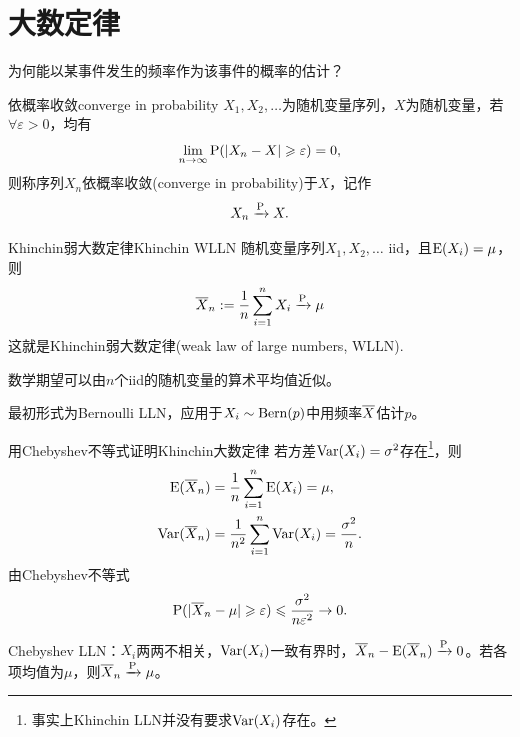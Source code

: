 \section{大数定律}
为何能以某事件发生的频率作为该事件的概率的估计？
\begin{definition}{依概率收敛}{converge in probability}
	$X_1,X_2,\ldots$为随机变量序列，$X$为随机变量，若$\forall\varepsilon > 0$，均有
	\begin{equation}\label{eq:ps-convergence-in-probability}
		\lim_{n\to\infty}\operatorname{P}(\lvert X_n - X\rvert \geqslant \varepsilon) = 0,
	\end{equation}
	则称序列$X_n$依概率收敛(converge in probability)于$X$，记作
	\[
		X_n \xrightarrow{\operatorname{P}} X.
	\]
\end{definition}
\begin{theorem}{Khinchin弱大数定律}{Khinchin WLLN}
	随机变量序列$X_1,X_2,\ldots$ iid，且$\operatorname{E}(X_i) = \mu$，则
	\begin{equation}
		\overline{X}_n := \frac1n\sum_{i=1}^nX_i \xrightarrow{\operatorname{P}} \mu
	\end{equation}
	这就是Khinchin弱大数定律(weak law of large numbers, WLLN).
\end{theorem}

\begin{corollary}
	数学期望可以由$n$个iid的随机变量的算术平均值近似。
\end{corollary}

\begin{remark}
	最初形式为Bernoulli LLN，应用于$X_i \sim \operatorname{Bern}(p)$中用频率$\overline{X}$估计$p$。
\end{remark}

\begin{example}{用Chebyshev不等式证明Khinchin大数定律}{}
	若方差$\operatorname{Var}(X_i) = \sigma^2$存在\footnote{事实上Khinchin LLN并没有要求$\operatorname{Var}(X_i)$存在。}，则
	\begin{subequations}
		\begin{align}
			\operatorname{E}(\overline{X}_n) &= \frac1n\sum_{i=1}^n\operatorname{E}(X_i) = \mu,\\
			\operatorname{Var}(\overline{X}_n) &= \frac1{n^2}\sum_{i=1}^n\operatorname{Var}(X_i) = \frac{\sigma^2}n.
		\end{align}
	\end{subequations}
	由Chebyshev不等式
	\[
		\operatorname{P}(\lvert\overline{X}_n - \mu\rvert \geqslant \varepsilon) \leqslant \frac{\sigma^2}{n\varepsilon^2} \to 0.
	\]
\end{example}

\begin{remark}
	Chebyshev LLN：$X_i$两两不相关，$\operatorname{Var}(X_i)$一致有界时，$\overline{X}_n - \operatorname{E}(\overline{X}_n) \xrightarrow{\operatorname{P}} 0$。若各项均值为$\mu$，则$\overline{X}_n \xrightarrow{\operatorname{P}} \mu$。
\end{remark}

